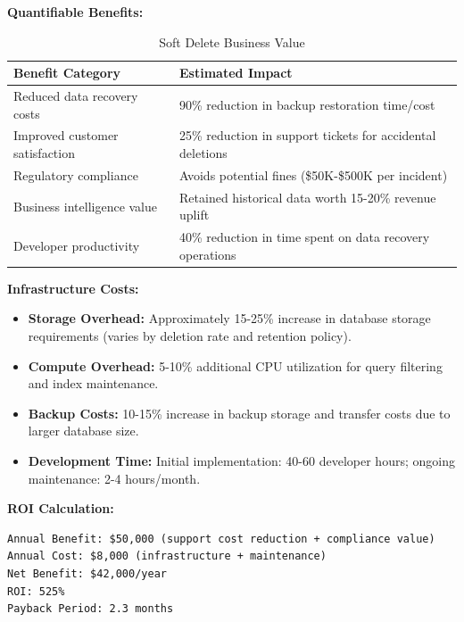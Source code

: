 \documentclass[12pt,a4paper]{article}
\begin{document}
\textbf{Quantifiable Benefits:}

\begin{table}[H]
\centering
\begin{tabular}{|p{6cm}|p{7cm}|}
\hline
\textbf{Benefit Category} & \textbf{Estimated Impact} \\
\hline
Reduced data recovery costs & 90\% reduction in backup restoration time/cost \\
\hline
Improved customer satisfaction & 25\% reduction in support tickets for accidental deletions \\
\hline
Regulatory compliance & Avoids potential fines (\$50K-\$500K per incident) \\
\hline
Business intelligence value & Retained historical data worth 15-20\% revenue uplift \\
\hline
Developer productivity & 40\% reduction in time spent on data recovery operations \\
\hline
\end{tabular}
\caption{Soft Delete Business Value}
\end{table}

\vspace{0.5em}

\textbf{Infrastructure Costs:}

\begin{itemize}[leftmargin=2em, itemsep=6pt]
    \item \textbf{Storage Overhead:} Approximately 15-25\% increase in database storage requirements (varies by deletion rate and retention policy).
    \item \textbf{Compute Overhead:} 5-10\% additional CPU utilization for query filtering and index maintenance.
    \item \textbf{Backup Costs:} 10-15\% increase in backup storage and transfer costs due to larger database size.
    \item \textbf{Development Time:} Initial implementation: 40-60 developer hours; ongoing maintenance: 2-4 hours/month.
\end{itemize}

\vspace{0.5em}

\textbf{ROI Calculation:}

\begin{verbatim}
Annual Benefit: $50,000 (support cost reduction + compliance value)
Annual Cost: $8,000 (infrastructure + maintenance)
Net Benefit: $42,000/year
ROI: 525%
Payback Period: 2.3 months
\end{verbatim}
\end{document}
